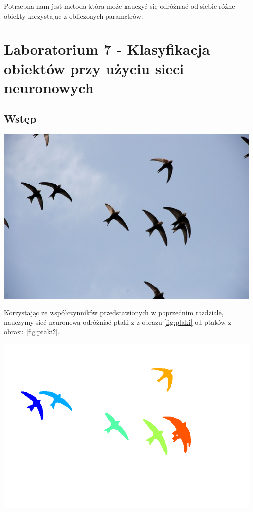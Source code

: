 \documentclass{article}
\begin{document}
	Potrzebna nam jest metoda która może nauczyć się odróżniać od siebie różne obiekty korzystając z obliczonych parametrów.
	
	\section{Laboratorium 7 - Klasyfikacja obiektów przy użyciu sieci neuronowych}
	\subsection{Wstęp}
	\begin{center}
		\includegraphics[width=\linewidth]{../../pictures/ptaki2.jpg}
		\label{fig:ptaki2}
	\end{center}
	Korzystając ze współczynników przedstawionych w poprzednim rozdziale, nauczymy sieć neuronową odróżniać ptaki z z obrazu \ref{fig:ptaki} od ptaków z obrazu \ref{fig:ptaki2}.
	
	\begin{center}
		\includegraphics[width=\linewidth]{../../lab07/ptaki2_label.png}
	\end{center}
\end{document}
